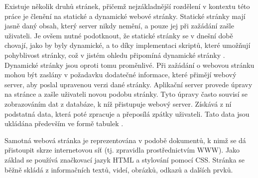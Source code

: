 Existuje několik druhů stránek, přičemž nejzákladnější rozdělení v kontextu této práce je členění na statické a dynamické webové stránky. Statické stránky mají jasně daný obsah, který server nikdy nemění, a pouze jej při zažádání zašle uživateli. Je ovšem nutné podotknout, že statické stránky se v dnešní době chovají, jako by byly dynamické, a to díky implementaci skriptů, které umožňují pohyblivost stránky, což v jistém ohledu připomíná dynamické stránky \cite{futureofsoftware}. 
Dynamické stránky jsou oproti tomu proměnlivé. Při zažádání o webovou stránku mohou být zaslány v požadavku dodatečné informace, které přimějí webový server, aby poslal upravenou verzi dané stránky. Aplikační server provede úpravy na stránce a zašle uživateli novou podobu stránky. Tyto úpravy často souvisí se zobrazováním dat z databáze, k níž přistupuje webový server. Získává z ní podstatná data, která poté zpracuje a přeposílá zpátky uživateli. Tato data jsou ukládána především ve formě tabulek \cite{futureofsoftware}.

Samotná webová stránka je reprezentována v podobě dokumentů, k nimž se dá přistoupit skrze internetovou síť (tj. zpravidla prostřednictvím WWW). Jako základ se používá značkovací jazyk HTML a stylování pomocí CSS. Stránka se běžně skládá z informačních textů, videí, obrázků, odkazů a dalších prvků.

